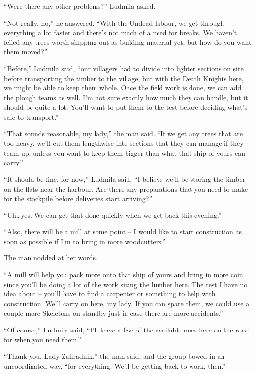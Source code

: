  

“Were there any other problems?” Ludmila asked.

 

“Not really, no,” he answered. “With the Undead labour, we get through everything a lot faster and there’s not much of a need for breaks. We haven’t felled any trees worth shipping out as building material yet, but how do you want them moved?”

 

“Before,” Ludmila said, “our villagers had to divide into lighter sections on site before transporting the timber to the village, but with the Death Knights here, we might be able to keep them whole. Once the field work is done, we can add the plough teams as well. I’m not sure exactly how much they can handle, but it should be quite a lot. You’ll want to put them to the test before deciding what’s safe to transport.”

 

“That sounds reasonable, my lady,” the man said. “If we get any trees that are too heavy, we’ll cut them lengthwise into sections that they can manage if they team up, unless you want to keep them bigger than what that ship of yours can carry.”

 

“It should be fine, for now,” Ludmila said. “I believe we’ll be storing the timber on the flats near the harbour. Are there any preparations that you need to make for the stockpile before deliveries start arriving?”

 

“Uh…yes. We can get that done quickly when we get back this evening.”

 

“Also, there will be a mill at some point – I would like to start construction as soon as possible if I’m to bring in more woodcutters.”

 

The man nodded at her words.

 

“A mill will help you pack more onto that ship of yours and bring in more coin since you’ll be doing a lot of the work sizing the lumber here. The rest I have no idea about – you’ll have to find a carpenter or something to help with construction. We’ll carry on here, my lady. If you can spare them, we could use a couple more Skeletons on standby just in case there are more accidents.”

 

“Of course,” Ludmila said, “I’ll leave a few of the available ones here on the road for when you need them.”

 

“Thank you, Lady Zahradnik,” the man said, and the group bowed in an uncoordinated way, “for everything. We’ll be getting back to work, then.”